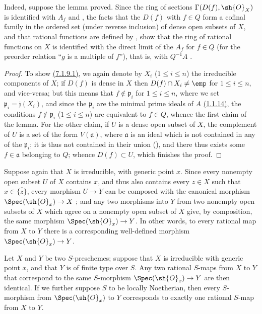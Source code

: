 Indeed, suppose the lemma proved. Since the ring of sections $\Gamma(D(f),\sh{O}_X)$ is identified with $A_f$  and , the facts that the $D(f)$ with $f\in Q$ form a cofinal family in the ordered set (under reverse inclusion) of dense open subsets of $X$, and that rational functions are defined by , show that the ring of rational functions on $X$ is identified with the direct limit of the $A_f$ for $f\in Q$ (for the preorder relation ``$g$ is a multiple of $f$''), that is, with $Q^{-1}A$ .

\begin{proof}
To show \hyperref[I.7.1.9.1]{(7.1.9.1)}, we again denote by $X_i$ ($1\leq i\leq n$) the irreducible components of $X$; if $D(f)$ is dense in $X$ then $D(f)\cap X_i\neq\emp$ for $1\leq i\leq n$, and vice-versa; but this means that $f\not\in\mathfrak{p}_i$ for $1\leq i\leq n$, where we set $\mathfrak{p}_i=\mathfrak{j}(X_i)$, and since the $\mathfrak{p}_i$ are the minimal prime ideals of $A$ \hyperref[I.1.1.14]{(1.1.14)}, the conditions $f\not\in\mathfrak{p}_i$ ($1\leq i\leq n$) are equivalent to $f\in Q$, whence the first claim of the lemma.
For the other claim, if $U$ is a dense open subset of $X$, the complement of $U$ is a set of the form $V(\mathfrak{a})$, where $\mathfrak{a}$ is an ideal which is not contained in any of the $\mathfrak{p}_i$; it is thus not contained in their union (\cite[p.~13]{I-10}), and there thus exists some $f\in\mathfrak{a}$ belonging to $Q$; whence $D(f)\subset U$, which finishes the proof.
\end{proof}

\begin{env}[7.1.10]
\label{I.7.1.10}
Suppose again that $X$ is irreducible, with generic point $x$.
Since every nonempty open subset $U$ of $X$ contains $x$, and thus also contains every $z\in X$ such that $x\in\overline{\{z\}}$, every morphism $U\to Y$ can be composed with the canonical morphism $\Spec(\sh{O}_x)\to X$ ; and any two morphisms into $Y$ from two nonempty open subsets of $X$ which agree on a nonempty open subset of $X$ give, by composition, the same morphism $\Spec(\sh{O}_x)\to Y$.
In other words, to every rational map from $X$ to $Y$ there is a corresponding well-defined morphism $\Spec(\sh{O}_x)\to Y$.
\end{env}

\begin{proposition}[7.1.11]
\label{I.7.1.11}
Let $X$ and $Y$ be two $S$-preschemes; suppose that $X$ is irreducible with generic point $x$, and that $Y$ is of finite type over $S$.
Any two rational $S$-maps from $X$ to $Y$ that correspond to the same $S$-morphism $\Spec(\sh{O}_x)\to Y$ are then identical.
If we further suppose $S$ to be locally Noetherian, then every $S$-morphism from $\Spec(\sh{O}_x)$ to $Y$ corresponds to exactly one rational $S$-map from $X$ to $Y$.
\end{proposition}

